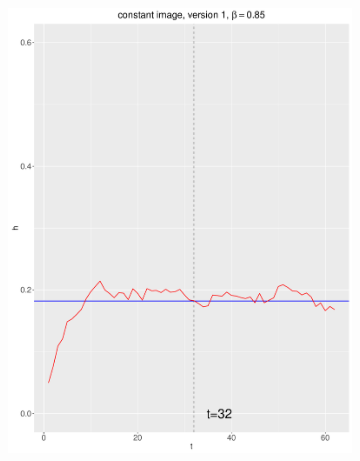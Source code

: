 \documentclass[12pt, oneside]{article}   	%
\begin{document}
\begin{figure}[H]
\begin{subfigure}[b]{0.475\textwidth}
            \includegraphics[width=\textwidth, height=0.32\textheight]{const_v1_85.pdf}
        \end{subfigure}
        \quad
        \begin{subfigure}[b]{0.475\textwidth}
            \centering

\end{subfigure}
\end{figure}
\end{document}
